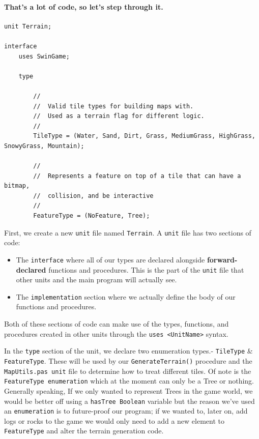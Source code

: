 \documentclass{article}
\begin{document}
\paragraph{That's a lot of code, so let's step through it.}\mbox{}

\begin{verbatim}
unit Terrain;

interface
	uses SwinGame;

	type

		//
		//	Valid tile types for building maps with.
		//	Used as a terrain flag for different logic.
		//
		TileType = (Water, Sand, Dirt, Grass, MediumGrass, HighGrass, SnowyGrass, Mountain);

		//
		//	Represents a feature on top of a tile that can have a bitmap,
		//	collision, and be interactive
		//
		FeatureType = (NoFeature, Tree);
\end{verbatim}

First, we create a new \texttt{unit} file named \texttt{Terrain}. A \texttt{unit} file has two sections of code: 

\begin{itemize}

\item
The \texttt{interface} where all of our types are declared alongside \textbf{forward-declared} functions and procedures. This is the part of the \texttt{unit} file that other units and the main program will actually see.

\item
The  \texttt{implementation} section where we actually define the body of our functions and procedures.

\end{itemize}

Both of these sections of code can make use of the types, functions, and procedures created in other units through the \texttt{uses <UnitName>} syntax.

In the \texttt{type} section of the unit, we declare two enumeration types.- \texttt{TileType} \& \texttt{FeatureType}. These will be used by our \texttt{GenerateTerrain()} procedure and the \texttt{MapUtils.pas unit} file to determine how to treat different tiles. Of note is the \texttt{FeatureType enumeration} which at the moment can only be a Tree or nothing. Generally speaking, If we only wanted to represent Trees in the game world, we would be better off using a \texttt{hasTree Boolean} variable but the reason we've used an \texttt{enumeration} is to future-proof our program; if we wanted to, later on, add logs or rocks to the game we would only need to add a new element to \texttt{FeatureType} and alter the terrain generation code.
\end{document}
